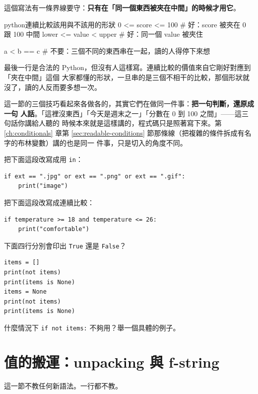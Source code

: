 這個寫法有一條界線要守：\textbf{只有在「同一個東西被夾在中間」的時候才用它}。

\begin{code}{python}{連續比較該用與不該用的形狀}
0 <= score <= 100          # 好：score 被夾在 0 跟 100 中間
lower <= value < upper     # 好：同一個 value 被夾住

a < b == c                 # 不要：三個不同的東西串在一起，讀的人得停下來想
\end{code}

最後一行是合法的 Python，但沒有人這樣寫。連續比較的價值來自它剛好對應到「夾在中間」這個
大家都懂的形狀，一旦串的是三個不相干的比較，那個形狀就沒了，讀的人反而要多想一次。

這一節的三個技巧看起來各做各的，其實它們在做同一件事：\textbf{把一句判斷，還原成一句
人話}。「這裡沒東西」「今天是週末之一」「分數在 0 到 100 之間」——這三句話你講給人聽的
時候本來就是這樣講的，程式碼只是照著寫下來。第 \ref{ch:conditionals} 章第
\ref{sec:readable-conditions} 節那條線（把複雜的條件拆成有名字的布林變數）講的也是同一
件事，只是切入的角度不同。

\begin{drills}[label=drills:condition-idioms]
\item 把下面這段改寫成用 \texttt{in}：
\begin{verbatim}
if ext == ".jpg" or ext == ".png" or ext == ".gif":
    print("image")
\end{verbatim}
\item 把下面這段改寫成連續比較：
\begin{verbatim}
if temperature >= 18 and temperature <= 26:
    print("comfortable")
\end{verbatim}
\item 下面四行分別會印出 \texttt{True} 還是 \texttt{False}？
\begin{verbatim}
items = []
print(not items)
print(items is None)
items = None
print(not items)
print(items is None)
\end{verbatim}
\item 什麼情況下 \texttt{if not items:} 不夠用？舉一個具體的例子。
\end{drills}

\section{值的搬運：unpacking 與 f-string}
\label{sec:value-idioms}

這一節不教任何新語法。一行都不教。

